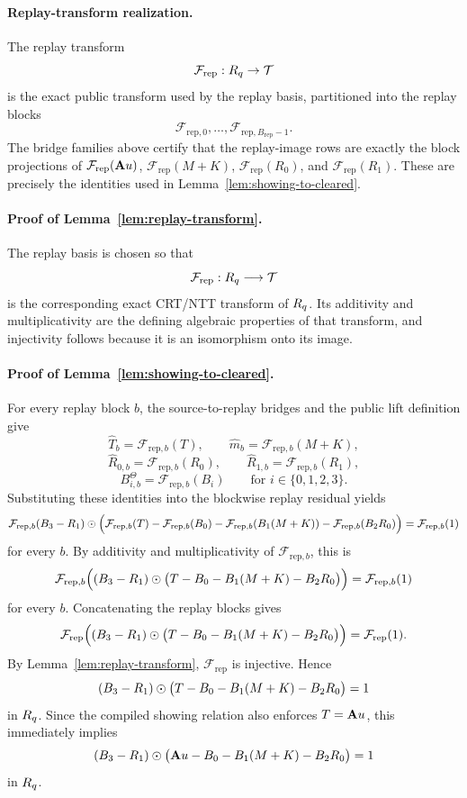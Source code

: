 \paragraph{Replay-transform realization.}
The replay transform
\[
\mathcal F_{\mathrm{rep}} : R_q \to \mathcal T
\]
is the exact public transform used by the replay basis, partitioned into the
replay blocks
\[
\mathcal F_{\mathrm{rep},0},\ldots,\mathcal F_{\mathrm{rep},B_{\mathrm{rep}}-1}.
\]
The bridge families above certify that the replay-image rows are exactly the
block projections of \(\mathcal F_{\mathrm{rep}}(\mathbf{A} u)\),
\(\mathcal F_{\mathrm{rep}}(M+K)\), \(\mathcal F_{\mathrm{rep}}(R_0)\), and
\(\mathcal F_{\mathrm{rep}}(R_1)\). These are precisely the identities used in
Lemma~\ref{lem:showing-to-cleared}.

\paragraph{Proof of Lemma~\ref{lem:replay-transform}.}
The replay basis is chosen so that
\[
\mathcal F_{\mathrm{rep}} : R_q \longrightarrow \mathcal T
\]
is the corresponding exact CRT/NTT transform of \(R_q\). Its additivity and multiplicativity are the defining algebraic
properties of that transform, and injectivity follows because it is an isomorphism onto its image.

\paragraph{Proof of Lemma~\ref{lem:showing-to-cleared}.}
For every replay block \(b\), the source-to-replay bridges and the public lift definition give
\[
\widehat T_b = \mathcal F_{\mathrm{rep},b}(T),
\qquad
\widehat m_b = \mathcal F_{\mathrm{rep},b}(M+K),
\]
\[
\widehat R_{0,b} = \mathcal F_{\mathrm{rep},b}(R_0),
\qquad
\widehat R_{1,b} = \mathcal F_{\mathrm{rep},b}(R_1),
\]
\[
B_{i,b}^\Theta = \mathcal F_{\mathrm{rep},b}(B_i)
\qquad\text{for }i\in\{0,1,2,3\}.
\]
Substituting these identities into the blockwise replay residual yields
\[
\mathcal F_{\mathrm{rep},b}(B_3-R_1)
\odot
\Bigl(\mathcal F_{\mathrm{rep},b}(T)-\mathcal F_{\mathrm{rep},b}(B_0)-\mathcal F_{\mathrm{rep},b}(B_1(M+K))-
\mathcal F_{\mathrm{rep},b}(B_2R_0)\Bigr)
=
\mathcal F_{\mathrm{rep},b}(1)
\]
for every \(b\). By additivity and multiplicativity of \(\mathcal F_{\mathrm{rep},b}\), this is
\[
\mathcal F_{\mathrm{rep},b}\Bigl((B_3-R_1)\odot\bigl(T-B_0-B_1(M+K)-B_2R_0\bigr)\Bigr)
=
\mathcal F_{\mathrm{rep},b}(1)
\]
for every \(b\). Concatenating the replay blocks gives
\[
\mathcal F_{\mathrm{rep}}\Bigl((B_3-R_1)\odot\bigl(T-B_0-B_1(M+K)-B_2R_0\bigr)\Bigr)
=
\mathcal F_{\mathrm{rep}}(1).
\]
By Lemma~\ref{lem:replay-transform}, \(\mathcal F_{\mathrm{rep}}\) is injective. Hence
\[
(B_3-R_1)\odot\bigl(T-B_0-B_1(M+K)-B_2R_0\bigr)=1
\]
in \(R_q\). Since the compiled showing relation also enforces \(T=\mathbf{A} u\), this immediately implies
\[
(B_3-R_1)\odot\bigl(\mathbf{A} u-B_0-B_1(M+K)-B_2R_0\bigr)=1
\]
in \(R_q\).

